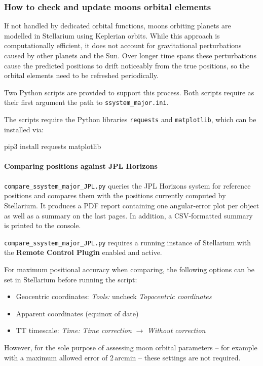 \subsubsection{How to check and update moons orbital elements}
\label{sec:ssystem.ini:MoonsOrbitalElements}

If not handled by dedicated orbital functions, moons orbiting planets are modelled in Stellarium using Keplerian orbits. While this
approach is computationally efficient, it does not account for gravitational perturbations
caused by other planets and the Sun. Over longer time spans these perturbations cause the
predicted positions to drift noticeably from the true positions, so the orbital elements
need to be refreshed periodically.

Two Python scripts are provided to support this process. Both scripts require as their first
argument the path to \texttt{ssystem\_major.ini}.

The scripts require the Python libraries \texttt{requests} and \texttt{matplotlib}, which
can be installed via:
\begin{commands}
pip3 install requests matplotlib
\end{commands}

\paragraph{Comparing positions against JPL Horizons}


\texttt{compare\_ssystem\_major\_JPL.py} queries the JPL Horizons system for reference
positions and compares them with the positions currently computed by Stellarium. It
produces a PDF report containing one angular-error plot per object as well as a summary
on the last pages. In addition, a CSV-formatted summary is printed to the console.

\texttt{compare\_ssystem\_major\_JPL.py} requires a running instance of Stellarium with
the \textbf{Remote Control Plugin} enabled and active.

For maximum positional accuracy when comparing, the following options can be set in
Stellarium before running the script:
\begin{itemize}
  \item Geocentric coordinates: \textit{Tools:} uncheck \textit{Topocentric coordinates}
  \item Apparent coordinates (equinox of date)
  \item TT timescale: \textit{Time:} \textit{Time correction} $\rightarrow$ \textit{Without correction}
\end{itemize}
However, for the sole purpose of assessing moon orbital parameters -- for example with a
maximum allowed error of 2\,arcmin -- these settings are not required.


